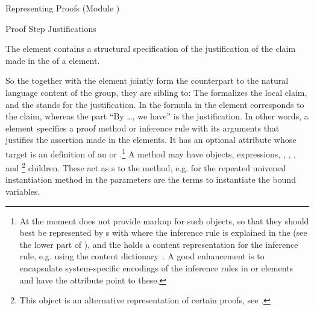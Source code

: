 \begin{omgroup}[id=proofs,short=Representing Proofs]{Representing Proofs (Module {})}
\begin{module}[id=justifications]
\begin{omgroup}[id=proofs.justifications]{Proof Step Justifications}
\begin{definition}[id=method.def]
  The {} element contains a structural specification of the justification of
  the claim made in the {} of a {} element.
\end{definition}
So the {} together with the {} element jointly form the
counterpart to the natural language content of the {} group, they are sibling
to: The {} formalizes the local claim, and the {} stands for
the justification. In {} the formula in the {} element
corresponds to the claim, whereas the part ``By \ldots, we have'' is the justification. In
other words, a {} element specifies a proof method or inference rule with
its arguments that justifies the assertion made in the {} elements.  It has
an optional {} attribute whose target is an {\omdoc} definition of
an {} or {}.\footnote{At the moment
  {\omdoc} does not provide markup for such objects, so that they should best be
  represented by {}s with {} where the inference rule
  is explained in the {} (see the lower part of {}), and the
  {} holds a content representation for the inference rule, e.g.  using the
  content dictionary~\cite{CD:inference-rules}.  A good enhancement is to encapsulate
  system-specific encodings of the inference rules in {} or
  {} elements and have the {} attribute point to
  these.} A method may have {\openmath} objects, {\cmathml} expressions,
{}, {}, {}, and
{}\footnote{This object is an alternative representation of certain
  proofs, see {}.} children.  These act as {}s to
the method, e.g. for the repeated universal instantiation method in {}
the parameters are the terms to instantiate the bound variables.
  

\end{omgroup}
\end{module}
\end{omgroup}

